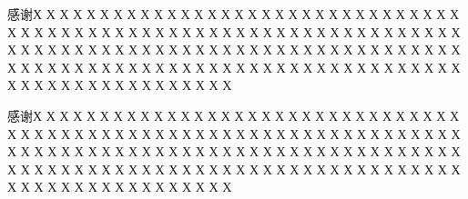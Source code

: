 
\begin{acknowledgements}

感谢Х Х Х Х Х Х Х Х Х Х Х Х Х Х Х Х Х Х Х Х Х Х Х Х Х Х Х Х Х Х Х Х Х Х Х Х Х Х Х Х Х Х Х Х Х Х Х Х Х Х Х Х Х Х Х Х Х Х Х Х Х Х Х Х Х Х Х Х Х Х Х Х Х Х Х Х Х Х Х Х Х Х Х Х Х Х Х Х Х Х Х Х Х Х Х Х Х Х Х Х Х Х Х Х Х Х Х Х Х Х Х Х Х Х Х Х Х Х Х Х Х Х Х Х Х Х Х Х Х Х Х Х Х Х Х Х Х Х Х Х Х Х Х Х Х Х Х Х Х Х Х 

感谢Х Х Х Х Х Х Х Х Х Х Х Х Х Х Х Х Х Х Х Х Х Х Х Х Х Х Х Х Х Х Х Х Х Х Х Х Х Х Х Х Х Х Х Х Х Х Х Х Х Х Х Х Х Х Х Х Х Х Х Х Х Х Х Х Х Х Х Х Х Х Х Х Х Х Х Х Х Х Х Х Х Х Х Х Х Х Х Х Х Х Х Х Х Х Х Х Х Х Х Х Х Х Х Х Х Х Х Х Х Х Х Х Х Х Х Х Х Х Х Х Х Х Х Х Х Х Х Х Х Х Х Х Х Х Х Х Х Х Х Х Х Х Х Х Х Х Х Х Х Х Х 

\end{acknowledgements}